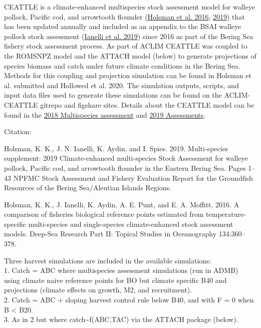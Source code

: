 \documentclass[]{article}
\begin{document}
CEATTLE is a climate-enhanced multispecies stock assessment model for
walleye pollock, Pacific cod, and arrowtooth flounder
(\href{\%22https://www.sciencedirect.com/science/article/pii/S0967064515002751\%22}{Holsman
et al. 2016},
\href{\%22https://archive.afsc.noaa.gov/refm/docs/2019/EBSmultispp.pdf\%22}{2019})
that has been updated annually and included as an appendix to the BSAI
walleye pollock stock assessment
(\href{\%22https://archive.afsc.noaa.gov/refm/docs/2019/GOApollock.pdf\%22}{Ianelli
et al. 2019}) since 2016 as part of the Bering Sea fishery stock
assessment process. As part of ACLIM CEATTLE was coupled to the ROMSNPZ
model and the ATTACH model (below) to generate projections of species
biomass and catch under future climate conditions in the Bering Sea.
Methods for this coupling and projection simulation can be found in
Holsman et al. submitted and Hollowed et al. 2020. The simulation
outputs, scripts, and input data files used to generate these
simulations can be found on the ACLIM-CEATTLE gitrepo and figshare
sites. Details about the CEATTLE model can be found in the
\href{\%22https://archive.fisheries.noaa.gov/afsc/REFM/Docs/2018/BSAI/2018EBSmultispp-508.pdf\%22}{2018
Multispecies assessment} and
\href{\%22https://archive.afsc.noaa.gov/refm/docs/2019/EBSmultispp.pdf\%22}{2019
Assessments}.

Citation:

Holsman, K. K., J. N. Ianelli, K. Aydin, and I. Spies. 2019.
Multi-species supplement: 2019 Climate-enhanced multi-species Stock
Assessment for walleye pollock, Pacific cod, and arrowtooth flounder in
the Eastern Bering Sea. Pages 1--43 NPFMC Stock Assessment and Fishery
Evaluation Report for the Groundfish Resources of the Bering
Sea/Aleutian Islands Regions.

Holsman, K. K., J. Ianelli, K. Aydin, A. E. Punt, and E. A. Moffitt.
2016. A comparison of fisheries biological reference points estimated
from temperature-specific multi-species and single-species
climate-enhanced stock assessment models. Deep-Sea Research Part II:
Topical Studies in Oceanography 134:360--378.

Three harvest simulations are included in the available simulations:\\
1. Catch = ABC where multispecies assessment simulations (run in ADMB)
using climate naive reference points for BO but climate specific B40 and
projections (climate effects on growth, M2, and recruitment).\\
2. Catch = ABC + sloping harvest control rule below B40, and with F = 0
when B \textless{} B20.\\
3. As in 2 but where catch\textasciitilde{}f(ABC,TAC) via the ATTACH
package (below).
\end{document}
